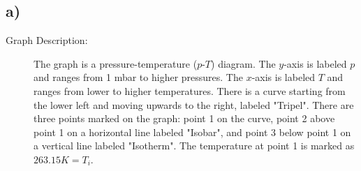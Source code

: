 

\subsection*{a)}

\begin{description}
    \item[Graph Description:] The graph is a pressure-temperature ($p$-$T$) diagram. The $y$-axis is labeled $p$ and ranges from 1 mbar to higher pressures. The $x$-axis is labeled $T$ and ranges from lower to higher temperatures. There is a curve starting from the lower left and moving upwards to the right, labeled "Tripel". There are three points marked on the graph: point 1 on the curve, point 2 above point 1 on a horizontal line labeled "Isobar", and point 3 below point 1 on a vertical line labeled "Isotherm". The temperature at point 1 is marked as $263.15K = T_i$.
\end{description}